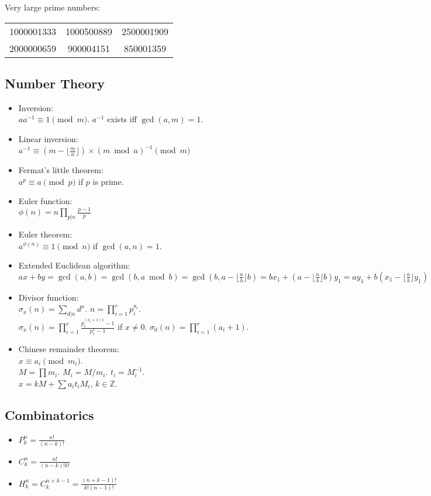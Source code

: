 \documentclass[twocolumn]{article}
\begin{document}
Very large prime numbers:\\
\begin{tabular}{ccc}
    1000001333 & 1000500889 & 2500001909 \\
    2000000659 & 900004151 & 850001359
\end{tabular}

\subsection{Number Theory}

\begin{itemize}
    \item Inversion:\\ $aa^{-1} \equiv 1 \pmod{m}$. $a^{-1}$ exists iff $\gcd(a,m)=1$.
    \item Linear inversion:\\ $a^{-1} \equiv (m - \lfloor\frac{m}{a}\rfloor) \times (m \bmod a)^{-1} \pmod{m}$
    \item Fermat's little theorem:\\ $a^p \equiv a \pmod{p}$ if $p$ is prime.
    \item Euler function:\\ $\phi(n)=n \prod_{p|n} \frac{p-1}{p}$
    \item Euler theorem:\\ $a^{\phi(n)} \equiv 1 \pmod{n}$ if $\gcd(a,n) = 1$.
    \item Extended Euclidean algorithm:\\
    $ax+by=\gcd(a,b)=\gcd(b, a \bmod b)=\gcd(b, a-\lfloor\frac{a}{b}\rfloor b)=bx_1+(a-\lfloor\frac{a}{b}\rfloor b)y_1=ay_1+b(x_1-\lfloor\frac{a}{b}\rfloor y_1)$
    \item Divisor function:\\ $\sigma_x(n) = \sum_{d|n}d^x$. $n=\prod_{i=1}^r p_i^{a_i}$.\\ $\sigma_x(n)=\prod_{i=1}^r \frac{p_i^{(a_i+1)x}-1}{p_i^x-1}$ if $x \neq 0$. $\sigma_0(n)=\prod_{i=1}^r (a_i+1)$.
    \item Chinese remainder theorem:\\ $x \equiv a_i \pmod{m_i}$.\\
        $M=\prod m_i$. $M_i=M/m_i$. $t_i=M_i^{-1}$.\\
        $x = kM + \sum a_i t_i M_i$, $k \in \mathbb{Z}$.
\end{itemize}

\subsection{Combinatorics}

\begin{itemize}
    \item $P^n_k=\frac{n!}{(n-k)!}$
    \item $C^n_k=\frac{n!}{(n-k)!k!}$
    \item $H^n_k=C^{n+k-1}_k=\frac{(n+k-1)!}{k!(n-1)!}$
\end{itemize}
\end{document}
